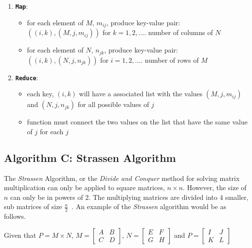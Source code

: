 \documentclass[10pt, conference]{IEEEtran}
\def\code#1{\texttt{#1}}
\begin{document}
\begin{enumerate}
\item \textbf{\code{Map}}:

\begin{itemize}
	\item for each element of $M$, $m_{ij}$, produce key-value pair:
		\subitem $((i,k), (M,j,m_{ij}))$ for $k = 1,2,....$ number of columns of $N$
	\item for each element of $N$, $n_{jk}$, produce key-value pair:
		\subitem $((i,k), (N,j,n_{jk}))$ for $i = 1,2,....$ number of rows of $M$
\end{itemize}


\item \textbf{\code{Reduce}}:
\begin{itemize}
	\item each key, $(i,k)$ will have a associated list with the values $(M,j,m_{ij})$ and $(N,j,n_{jk})$ for all possible values of $j$
	\item function must connect the two values on the list that have the same value of $j$ for each $j$

\end{itemize}
	
\end{enumerate}


\subsection{Algorithm C: Strassen Algorithm}
\label{Algorithm C}
The \emph{Strassen} Algorithm, or the \emph{Divide and Conquer} method for solving matrix multiplication can only be applied to square matrices, $n \times n$. However, the size of $n$ can only be in powers of 2. The multiplying matrices are divided into 4 smaller, sub matrices of size $\frac{n}{2}$~\cite{TutorialsPoint, GFG}. An example of the \emph{Strassen} algorithm would be as follows.

Given that $P=M\times N$, $M = \begin{bmatrix}
A &B \\ 
C &D 
\end{bmatrix}$, $N = \begin{bmatrix}
E &F \\ 
G &H 
\end{bmatrix}$ and $P = \begin{bmatrix}
I &J \\ 
K &L 
\end{bmatrix}$
\end{document}

